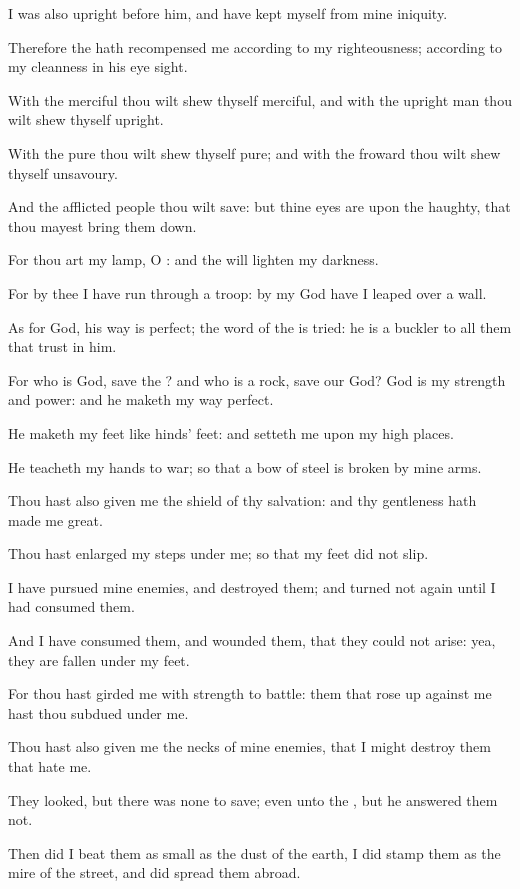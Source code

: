 \verse I was also upright before him, and have kept myself from mine iniquity.

\verse Therefore the \LORD hath recompensed me according to my righteousness; according to my cleanness in his eye sight.

\verse With the merciful thou wilt shew thyself merciful, and with the upright man thou wilt shew thyself upright.

\verse With the pure thou wilt shew thyself pure; and with the froward thou wilt shew thyself unsavoury.

\verse And the afflicted people thou wilt save: but thine eyes are upon the haughty, that thou mayest bring them down.

\verse For thou art my lamp, O \LORD: and the \LORD will lighten my darkness.

\verse For by thee I have run through a troop: by my God have I leaped over a wall.

\verse As for God, his way is perfect; the word of the \LORD is tried: he is a buckler to all them that trust in him.

\verse For who is God, save the \LORD? and who is a rock, save our God?  \verse God is my strength and power: and he maketh my way perfect.

\verse He maketh my feet like hinds' feet: and setteth me upon my high places.

\verse He teacheth my hands to war; so that a bow of steel is broken by mine arms.

\verse Thou hast also given me the shield of thy salvation: and thy gentleness hath made me great.

\verse Thou hast enlarged my steps under me; so that my feet did not slip.

\verse I have pursued mine enemies, and destroyed them; and turned not again until I had consumed them.

\verse And I have consumed them, and wounded them, that they could not arise: yea, they are fallen under my feet.

\verse For thou hast girded me with strength to battle: them that rose up against me hast thou subdued under me.

\verse Thou hast also given me the necks of mine enemies, that I might destroy them that hate me.

\verse They looked, but there was none to save; even unto the \LORD, but he answered them not.

\verse Then did I beat them as small as the dust of the earth, I did stamp them as the mire of the street, and did spread them abroad.

